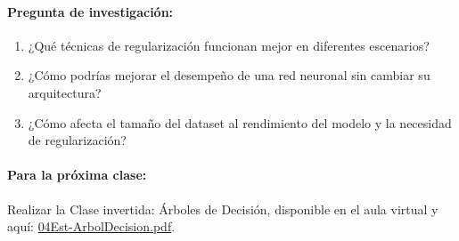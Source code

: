 \documentclass[a4,11pt]{aleph-notas}
\begin{document}
\paragraph{Pregunta de investigación:}
\begin{enumerate}[leftmargin=*]
    \item ¿Qué técnicas de regularización funcionan mejor en diferentes escenarios?
    \item ¿Cómo podrías mejorar el desempeño de una red neuronal sin cambiar su arquitectura?
    \item ¿Cómo afecta el tamaño del dataset al rendimiento del modelo y la necesidad de regularización?
\end{enumerate}

\paragraph{Para la próxima clase:}
Realizar la Clase invertida: Árboles de Decisión, disponible en el aula virtual y aquí: \href{https://andres-merino.github.io/AprendizajeAutomaticoInicial-05-N0105/2-ClaseInvertida/04Est-ArbolDecision.pdf}{04Est-ArbolDecision.pdf}.
\end{document}
